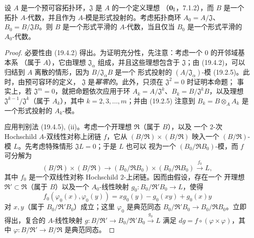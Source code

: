 \begin{proposition}[19.4.7]
\label{0.19.4.7-fr}
设 $A$ 是一个预可容拓扑环，$\mathfrak J$ 是 $A$ 的一个定义理想
（$\mathbf 0_{\rm I}$，7.1.2），而 $B$ 是一个拓扑 $A$-代数，并且作为
$A$-模是形式投射的。考虑拓扑商环 $A_0=A/\mathfrak J$、
$B_0=B/\mathfrak JB$。则 $B$ 是一个形式平滑的 $A$-代数，当且仅当
$B_0$ 是一个形式平滑的 $A_0$-代数。
\end{proposition}


\begin{proof}
必要性由 (19.4.2) 得出。为证明充分性，先注意：考虑一个 $0$ 的开邻域基本系
（属于 $A$），它由理想 $\mathfrak J_\alpha$ 组成，并且这些理想包含于
$\mathfrak J$；由
(19.4.2)，可以归结到 $A$ 离散的情形，因为 $B/\mathfrak J_\alpha B$ 是一个
形式投射的 $(A/\mathfrak J_\alpha)$-模 (19.2.5)。此时，由预可容环的定义，
$\mathfrak J$ 是\emph{幂零的}。此外，只须在 $\mathfrak J^2=0$ 时证明本命题；
事实上，若 $\mathfrak J^m=0$，就把命题依次应用于环
$A_k=A/\mathfrak J^k$、$B_k=B/\mathfrak J^kB$，以及理想
$\mathfrak J^{k-1}/\mathfrak J^k$（属于 $A_k$），其中 $k=2,3,\ldots,m$；并由 (19.2.5)
注意到 $B_k=B\otimes_A A_k$ 是一个形式投射的 $A_k$-模。

应用判别法 (19.4.5), (ii)。考虑一个开理想 $\mathfrak R$（属于 $B$），以及
一个 $2$-次 Hochschild $A$-双线性对称上闭链 $f$，它从
$(B/\mathfrak R)\times(B/\mathfrak R)$ 映入一个
$(B/\mathfrak R)$-模 $L$。先考虑特殊情形 $\mathfrak JL=0$；于是 $L$ 也可以
视为一个 $(B_0/\mathfrak RB_0)$-模，而 $f$ 可分解为
\[
  (B/\mathfrak R)\times(B/\mathfrak R)\to
  (B_0/\mathfrak RB_0)\times(B_0/\mathfrak RB_0)
  \xrightarrow{f_0}L,
\]
其中 $f_0$ 是一个双线性对称 Hochschild $2$-上闭链。因而由假设，存在一个
开理想 $\mathfrak R'\subset\mathfrak R$（属于 $B$）以及一个 $A_0$-线性映射
$g_0:B_0/\mathfrak R'B_0\to L$，使得
\[
  f_0(\varphi_0(x),\varphi_0(y))
  =xg_0(y)-g_0(xy)+g_0(x)y
\]
对 $x,y$（属于 $B_0/\mathfrak R'B_0$）成立；这里 $\varphi_0$ 是典范同态
$B_0/\mathfrak R'B_0\to B_0/\mathfrak RB_0$。立即得出，复合的
$A$-线性映射 $g:B/\mathfrak R'\to
B_0/\mathfrak R'B_0\xrightarrow{g_0}L$ 满足
$dg=f\circ(\varphi\times\varphi)$，其中
$\varphi:B/\mathfrak R'\to B/\mathfrak R$ 是典范同态。


\end{proof}
